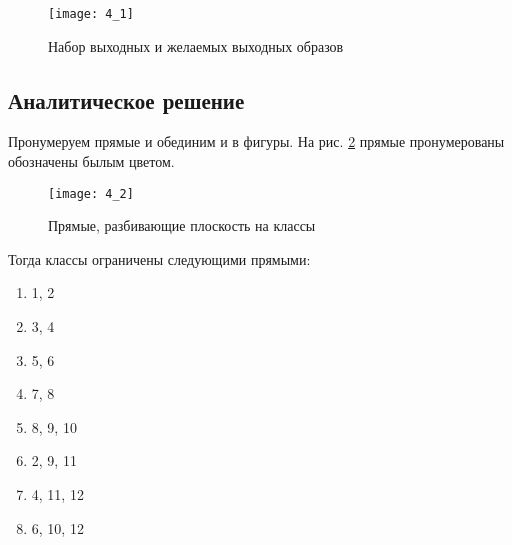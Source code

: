 \begin{figure}[H]
\begin{center}
	\texttt{[image: 4\_1]}
	\caption{Набор выходных и желаемых выходных образов}
	\label{fig:4_1}
\end{center}
\end{figure}

\subsection{Аналитическое решение}


Пронумеруем прямые и обединим и в фигуры. На рис. \ref{fig:4_2} прямые пронумерованы обозначены былым цветом.
\begin{figure}[H]
\begin{center}
	\texttt{[image: 4\_2]}
	\caption{Прямые, разбивающие плоскость на классы}
	\label{fig:4_2}
\end{center}
\end{figure}

Тогда классы ограничены следующими прямыми:

\begin{multicols}{4}
\begin{enumerate}[label=\arabic*)]
	\item 1, 2
	\item 3, 4
	\item 5, 6
	\item 7, 8
	\item 8, 9, 10
	\item 2, 9, 11
	\item 4, 11, 12
	\item 6, 10, 12
\end{enumerate}
\end{multicols}

